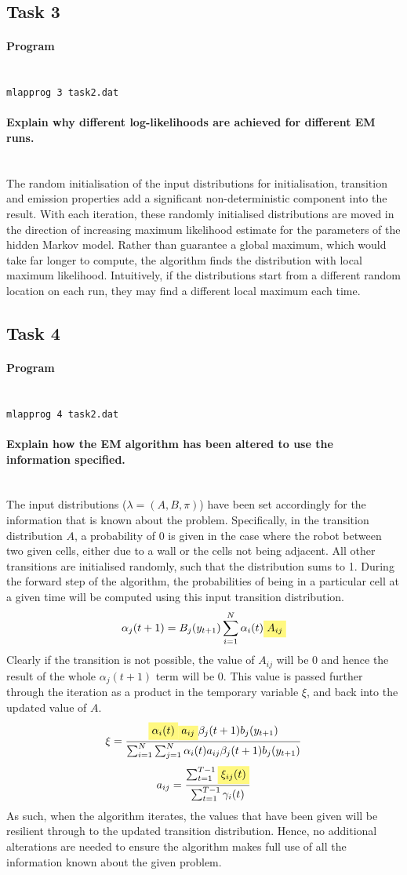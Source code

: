 \documentclass{article}
\newcommand{\myparagraph}[1]{\paragraph{#1}\mbox{}\\}
\newcommand{\highlight}[1]{\colorbox{yellow!50}{$\displaystyle#1$}}
\begin{document}
\subsection{Task 3}
\myparagraph{Program} %
\texttt{mlap\textunderscore prog 3 task2.dat}

\myparagraph{Explain why different log-likelihoods are achieved for different EM runs.}
The random initialisation of the input distributions for initialisation, transition and emission properties add a significant non-deterministic component into the result. With each iteration, these randomly initialised distributions are moved in the direction of increasing maximum likelihood estimate for the parameters of the hidden Markov model. Rather than guarantee a global maximum, which would take far longer to compute, the algorithm finds the distribution with local maximum likelihood. Intuitively, if the distributions start from a different random location on each run, they may find a different local maximum each time.

\subsection{Task 4}
\myparagraph{Program} %
\texttt{mlap\textunderscore prog 4 task2.dat}

\myparagraph{Explain how the EM algorithm has been altered to use the information specified.} %
The input distributions ($\lambda = (A, B, \pi)$) have been set accordingly for the information that is known about the problem. Specifically, in the transition distribution $A$, a probability of 0 is given in the case where the robot between two given cells, either due to a wall or the cells not being adjacent. All other transitions are initialised randomly, such that the distribution sums to 1. During the forward step of the algorithm, the probabilities of being in a particular cell at a given time will be computed using this input transition distribution.
\[\alpha_j(t+1) = B_j(y_{t+1}) \sum_{i=1}^{N}\alpha_i(t)\highlight{A_{ij}}\]
Clearly if the transition is not possible, the value of $A_{ij}$ will be 0 and hence the result of the whole $\alpha_j(t+1)$ term will be 0. This value is passed further through the iteration as a product in the temporary variable $\xi$, and back into the updated value of $A$. 
\[\xi = \frac{\highlight{\alpha_i(t)}\highlight{a_{ij}}\beta_j(t+1) b_j(y_{t+1})}{\sum_{i=1}^{N}\sum_{j=1}^{N} \alpha_i(t) a_{ij} \beta_j(t+1)b_j(y_{t+1})}\]
\[a_{ij} = \frac{\sum_{t = 1}^{T-1}\highlight{\xi_{ij}(t)}}{\sum_{t = 1}^{T-1}\gamma_i(t)}\]
As such, when the algorithm iterates, the values that have been given will be resilient through to the updated transition distribution. Hence, no additional alterations are needed to ensure the algorithm makes full use of all the information known about the given problem.
\end{document}

